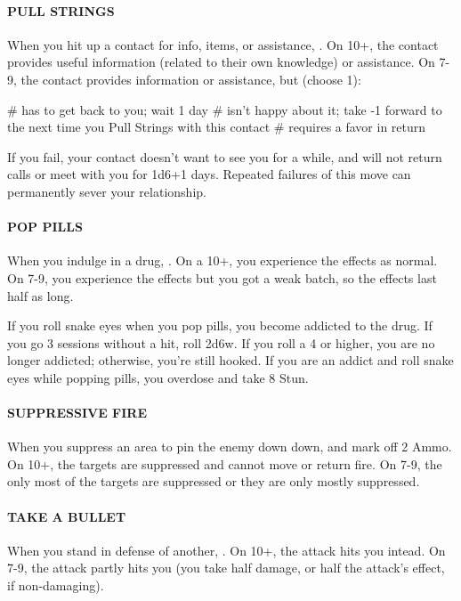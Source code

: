 \paragraph{PULL STRINGS}
When you hit up a contact for info, items, or assistance, . On 10+, the contact provides useful information (related to their own knowledge) or assistance. On 7-9, the contact provides information or assistance, but (choose 1):
\begin{easylist}
    # has to get back to you; wait 1 day
    # isn’t happy about it; take -1 forward to the next time you Pull Strings with this contact
    # requires a favor in return
\end{easylist}
If you fail, your contact doesn’t want to see you for a while, and will not return calls or meet with you for 1d6+1 days. Repeated failures of this move can permanently sever your relationship.

\paragraph{POP PILLS}
When you indulge in a drug, . On a 10+, you experience the effects as normal. On 7-9, you experience the effects but you got a weak batch, so the effects last half as long.

If you roll snake eyes when you pop pills, you become addicted to the drug. If you go 3 sessions without a hit, roll 2d6w. If you roll a 4 or higher, you are no longer addicted; otherwise, you’re still hooked. If you are an addict and roll snake eyes while popping pills, you overdose and take 8 Stun.


\paragraph{SUPPRESSIVE FIRE}
When you suppress an area to pin the enemy down down,  and mark off 2 Ammo. On 10+, the targets are suppressed and cannot move or return fire. On 7-9, the only most of the targets are suppressed or they are only mostly suppressed.

\paragraph{TAKE A BULLET}
When you stand in defense of another, . On 10+, the attack hits you intead. On 7-9, the attack partly hits you (you take half damage, or half the attack’s effect, if non-damaging).



